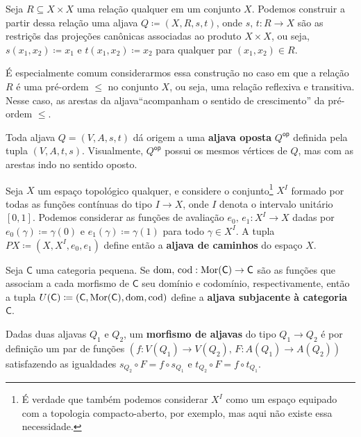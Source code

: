 \begin{exem}\label{exem:aljava_via_relacao}
    Seja $R \subseteq X \times X$ uma relação qualquer em um conjunto $X$.
    Podemos construir a partir dessa relação uma aljava $Q \coloneqq (X,R,s,t)$, onde $s,\,t: R \to X$ são as restriçõs das projeções canônicas associadas ao produto $X \times X$, ou seja, $s(x_1,x_2) \coloneqq x_1$ e $t(x_1,x_2) \coloneqq x_2$ para qualquer par $(x_1,x_2) \in R$.

    É especialmente comum considerarmos essa construção no caso em que a relação $R$ é uma pré-ordem $\leq$ no conjunto $X$, ou seja, uma relação reflexiva e transitiva.
    Nesse caso, as arestas da aljava``acompanham o sentido de crescimento'' da pré-ordem $\leq$.
\end{exem}

\begin{exem}\label{exem:aljava_oposta}
    Toda aljava $Q=(V,A,s,t)$ dá origem a uma \textbf{aljava oposta} $Q^{\mathsf{op}}$ definida pela tupla $(V,A,t,s)$.
    Visualmente, $Q^{\mathsf{op}}$ possui os mesmos vértices de $Q$, mas com as arestas indo no sentido oposto.
\end{exem}

\begin{exem}\label{exem:aljava_via_espaco}
    Seja $X$ um espaço topológico qualquer, e considere o conjunto\footnote{É verdade que também podemos considerar $X^I$ como um espaço equipado com a topologia compacto-aberto, por exemplo, mas aqui não existe essa necessidade.} $X^I$ formado por todas as funções contínuas do tipo $I \to X$, onde $I$ denota o intervalo unitário $[0,1]$.
    Podemos considerar as funções de avaliação $e_0,\, e_1: X^I \to X$ dadas por $e_0(\gamma) \coloneqq \gamma(0)$ e $e_1(\gamma) \coloneqq \gamma(1)$ para todo $\gamma \in X^{I}$.
    A tupla $PX \coloneqq (X,X^I,e_0,e_1)$ define então a \textbf{aljava de caminhos} do espaço $X$.
\end{exem}

\begin{exem}\label{exem:aljava_subjacente_categoria}
    Seja $\mathsf{C}$ uma categoria pequena.
    Se $\mathrm{dom},\,\mathrm{cod}: \mathrm{Mor}(\mathsf{C}) \to \mathsf{C}$ são as funções que associam a cada morfismo de $\mathsf{C}$ seu domínio e codomínio, respectivamente, então a tupla $U(\mathsf{C}) \coloneqq (\mathsf{C},\mathrm{Mor}(\mathsf{C}),\mathrm{dom},\mathrm{cod})$ define a \textbf{aljava subjacente à categoria} $\mathsf{C}$.
\end{exem}

\begin{defin}\label{defin:morfismo_aljavas}
    Dadas duas aljavas $Q_1$ e $Q_2$, um \textbf{morfismo de aljavas} do tipo $Q_1 \to Q_2$ é por definição um par de funções $(f: V(Q_1) \to V(Q_2),\, F: A(Q_1) \to A(Q_2))$ satisfazendo as igualdades $s_{Q_2} \circ F = f \circ s_{Q_1}$ e $t_{Q_2} \circ F = f \circ t_{Q_1}$.
\end{defin}

